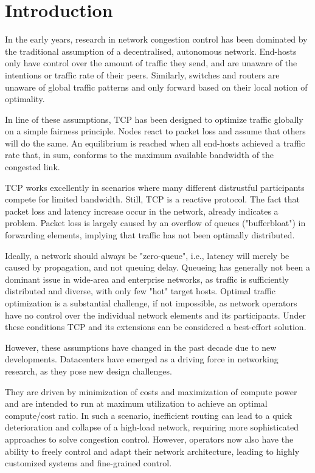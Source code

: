 \section{Introduction}
\label{sec:intro}
In the early years, research in network congestion control has been dominated by the traditional assumption of a decentralised, autonomous network. End-hosts only have control over the amount of traffic they send, and are unaware of the intentions or traffic rate of their peers. Similarly, switches and routers are unaware of global traffic patterns and only forward based on their local notion of optimality.

In line of these assumptions, TCP has been designed to optimize traffic globally on a simple fairness principle. Nodes react to packet loss and assume that others will do the same. An equilibrium is reached when all end-hosts achieved a traffic rate that, in sum, conforms to the maximum available bandwidth of the congested link.

TCP works excellently in scenarios where many different distrustful participants compete for limited bandwidth. Still, TCP is a reactive protocol. The fact that packet loss and latency increase occur in the network, already indicates a problem. Packet loss is largely caused by an overflow of queues ("bufferbloat") in forwarding elements, implying that traffic has not been optimally distributed.

Ideally, a network should always be "zero-queue", i.e., latency will merely be caused by propagation, and not queuing delay.
Queueing has generally not been a dominant issue in wide-area and enterprise networks, as traffic is sufficiently distributed and diverse, with only few "hot" target hosts. Optimal traffic optimization is a substantial challenge, if not impossible, as network operators have no control over the individual network elements and its participants. Under these conditions TCP and its extensions can be considered a best-effort solution. 

However, these assumptions have changed in the past decade due to new developments. Datacenters have emerged as a driving force in networking research, as they pose new design challenges.

They are driven by minimization of costs and maximization of compute power and are intended to run at maximum utilization to achieve an optimal compute/cost ratio. In such a scenario, inefficient routing can lead to a quick deterioration and collapse of a high-load network, requiring more sophisticated approaches to solve congestion control.
However, operators now also have the ability to freely control and adapt their network architecture, leading to highly customized systems and fine-grained control.

